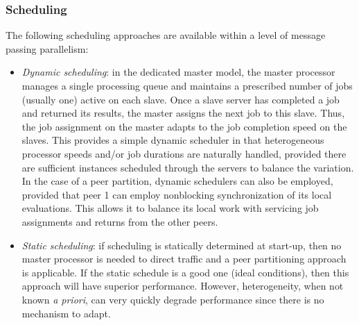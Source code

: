 \subsubsection{Scheduling}\label{parallel:SLP:message:sched}

The following scheduling approaches are available within a level of
message passing parallelism:

\begin{itemize}
\item \emph{Dynamic scheduling}: in the dedicated master model, the
  master processor manages a single processing queue and maintains a
  prescribed number of jobs (usually one) active on each slave. Once a
  slave server has completed a job and returned its results, the
  master assigns the next job to this slave. Thus, the job assignment
  on the master adapts to the job completion speed on the slaves. This
  provides a simple dynamic scheduler in that heterogeneous processor
  speeds and/or job durations are naturally handled, provided there
  are sufficient instances scheduled through the servers to balance
  the variation.  In the case of a peer partition, dynamic schedulers
  can also be employed, provided that peer 1 can employ nonblocking
  synchronization of its local evaluations.  This allows it to balance
  its local work with servicing job assignments and returns from the
  other peers.

\item \emph{Static scheduling}: if scheduling is statically determined
  at start-up, then no master processor is needed to direct traffic
  and a peer partitioning approach is applicable. If the static
  schedule is a good one (ideal conditions), then this approach will
  have superior performance. However, heterogeneity, when not known
  \emph{a priori}, can very quickly degrade performance since there is
  no mechanism to adapt.
\end{itemize}


